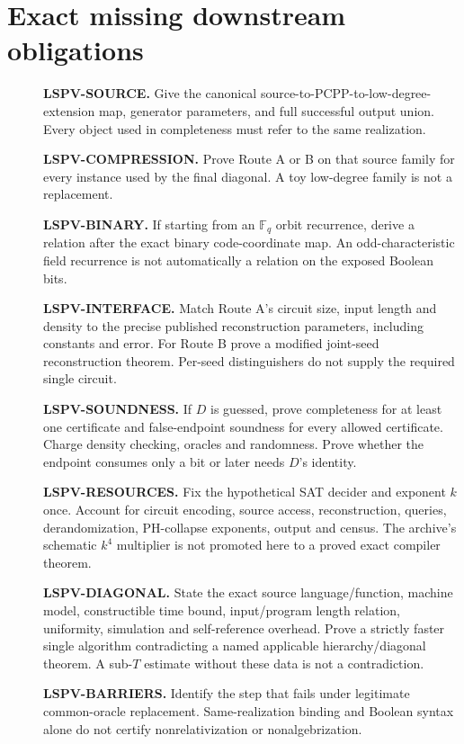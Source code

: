 \documentclass[11pt]{article}
\newcommand{\F}{\mathbb F}
\begin{document}
\section{Exact missing downstream obligations}
\begin{description}
\item[] \textbf{LSPV-SOURCE.}
Give the canonical source-to-PCPP-to-low-degree-extension map, generator
parameters, and full successful output union. Every object used in
completeness must refer to the same realization.
\item[] \textbf{LSPV-COMPRESSION.}
Prove Route A or B on that source family for every instance used by the
final diagonal. A toy low-degree family is not a replacement.
\item[] \textbf{LSPV-BINARY.}
If starting from an $\F_q$ orbit recurrence, derive a relation after
the exact binary code-coordinate map. An odd-characteristic field
recurrence is not automatically a relation on the exposed Boolean bits.
\item[] \textbf{LSPV-INTERFACE.}
Match Route A's circuit size, input length and density to the precise
published reconstruction parameters, including constants and error.
For Route B prove a modified joint-seed reconstruction theorem.
Per-seed distinguishers do not supply the required single circuit.
\item[] \textbf{LSPV-SOUNDNESS.}
If $D$ is guessed, prove completeness for at least one certificate
and false-endpoint soundness for every allowed certificate.
Charge density checking, oracles and randomness. Prove whether the
endpoint consumes only a bit or later needs $D$'s identity.
\item[] \textbf{LSPV-RESOURCES.}
Fix the hypothetical SAT decider and exponent $k$ once.
Account for circuit encoding, source access, reconstruction, queries,
derandomization, PH-collapse exponents, output and census.
The archive's schematic $k^4$ multiplier is not promoted here to a
proved exact compiler theorem.
\item[] \textbf{LSPV-DIAGONAL.}
State the exact source language/function, machine model, constructible
time bound, input/program length relation, uniformity, simulation and
self-reference overhead. Prove a strictly faster single algorithm
contradicting a named applicable hierarchy/diagonal theorem.
A sub-$T$ estimate without these data is not a contradiction.
\item[] \textbf{LSPV-BARRIERS.}
Identify the step that fails under legitimate common-oracle replacement.
Same-realization binding and Boolean syntax alone do not certify
nonrelativization or nonalgebrization.
\end{description}
\end{document}
